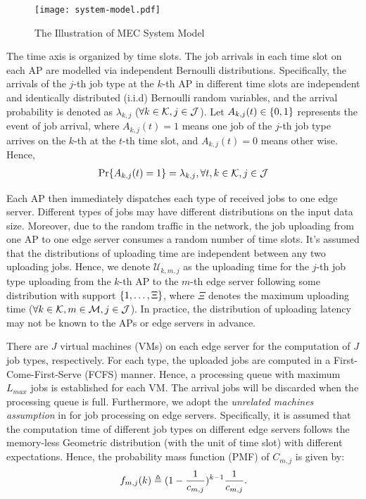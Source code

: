 \begin{figure}[ht]
    \centering
    \texttt{[image: system-model.pdf]}
    \caption{The Illustration of MEC System Model}
    \label{fig:system}
\end{figure}

The time axis is organized by time slots.
The job arrivals in each time slot on each AP are modelled via independent Bernoulli distributions.
Specifically, the arrivals of the $j$-th job type at the $k$-th AP in different time slots are independent and identically distributed (i.i.d) Bernoulli random variables, and the arrival probability is denoted as $\lambda_{k,j}$ ($\forall k\in\mathcal{K}, j\in\mathcal{J}$).
Let $A_{k,j}(t) \in \{0,1\}$ represents the event of job arrival, where $A_{k,j}(t)=1$ means one job of the $j$-th job type arrives on the $k$-th at the $t$-th time slot, and $A_{k,j}(t)=0$ means other wise.
Hence,
\begin{align}
    \Pr\{ A_{k,j}(t) = 1 \} = \lambda_{k,j}, \forall t,k\in\mathcal{K},j\in\mathcal{J}
\end{align}

Each AP then immediately dispatches each type of received jobs to one edge server.
Different types of jobs may have different distributions on the input data size.
Moreover, due to the random traffic in the network, the job uploading from one AP to one edge server consumes a random number of time slots.
It's assumed that the distributions of uploading time are independent between any two uploading jobs.
Hence, we denote $\mathcal{U}_{k,m,j}$ as the uploading time for the $j$-th job type uploading from the $k$-th AP to the $m$-th edge server following some distribution with support $\{1, \dots, \Xi\}$, where $\Xi$ denotes the maximum uploading time ($\forall k\in\mathcal{K}, m\in\mathcal{M}, j\in\mathcal{J}$).
In practice, the distribution of uploading latency may not be known to the APs or edge servers in advance.

There are $J$ virtual machines (VMs) on each edge server for the computation of $J$ job types, respectively.
For each type, the uploaded jobs are computed in a First-Come-First-Serve (FCFS) manner.
Hence, a processing queue with maximum $L_{max}$ jobs is established for each VM.
The arrival jobs will be discarded when the processing queue is full.
Furthermore, we adopt the \emph{unrelated machines assumption} in \cite{tan-online} for job processing on edge servers.
Specifically, it is assumed that the computation time of different job types on different edge servers follows the memory-less Geometric distribution (with the unit of time slot) with different expectations.
Hence, the probability mass function (PMF) of $C_{m,j}$ is given by:
\begin{align}
    f_{m,j}(k) \triangleq (1-\frac{1}{c_{m,j}})^{k-1} \frac{1}{c_{m,j}}.
\end{align}

